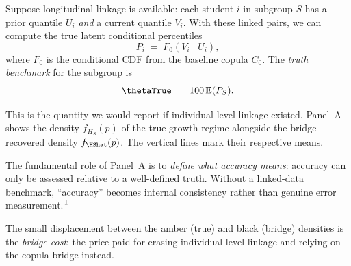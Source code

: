 \documentclass[10pt]{article}
\begin{document}
\noindent
\begin{minipage}[t]{3.75in}
  \vspace{0.05in}
  \hspace{0.15in}%
  \begin{minipage}{3.45in}
    \small\raggedright\color{bodyGrey}

    Suppose longitudinal linkage is available: each student $i$ in subgroup $S$
    has a prior quantile $U_i$ \emph{and} a current quantile $V_i$. With these
    linked pairs, we can compute the true latent conditional percentiles
    \[
      P_i \;=\; F_0(V_i \mid U_i),
    \]
    where $F_0$ is the conditional CDF from the baseline copula $C_0$. The
    \emph{truth benchmark} for the subgroup is
    \[
      \thetaTrue \;=\; 100\,\mathbb{E}(P_S).
    \]

    \vspace{4pt}
    This is the quantity we would report if individual-level linkage existed.
    Panel~A shows the density $f_{H_S}(p)$ of the true growth regime alongside
    the bridge-recovered density $f_{\HShat}(p)$. The vertical lines mark their
    respective means.

    \vspace{4pt}
    The fundamental role of Panel~A is to \emph{define what accuracy means}:
    accuracy can only be assessed relative to a well-defined truth. Without
    a linked-data benchmark, ``accuracy'' becomes internal consistency rather
    than genuine error measurement.$^{\mbox{\footnotesize{1}}}$

    \vspace{4pt}
    The small displacement between the amber (true) and black (bridge)
    densities is the \emph{bridge cost}: the price paid for erasing
    individual-level linkage and relying on the copula bridge instead.

  \end{minipage}
  \vspace{0.1in}
\end{minipage}
\end{document}
